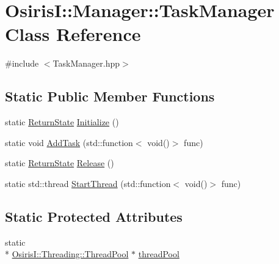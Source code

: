 \hypertarget{class_osiris_i_1_1_manager_1_1_task_manager}{\section{Osiris\-I\-:\-:Manager\-:\-:Task\-Manager Class Reference}
\label{class_osiris_i_1_1_manager_1_1_task_manager}
}


{\ttfamily \#include $<$Task\-Manager.\-hpp$>$}

\subsection*{Static Public Member Functions}
\begin{DoxyCompactItemize}
\item 
static \hyperlink{namespace_osiris_i_a8f53bf938dc75c65c6a529694514013e}{Return\-State} \hyperlink{class_osiris_i_1_1_manager_1_1_task_manager_a5c63688497335d230c16982063264760}{Initialize} ()
\item 
static void \hyperlink{class_osiris_i_1_1_manager_1_1_task_manager_ae21751b24ac0c69245a5f3a5583e3bf8}{Add\-Task} (std\-::function$<$ void()$>$ func)
\item 
static \hyperlink{namespace_osiris_i_a8f53bf938dc75c65c6a529694514013e}{Return\-State} \hyperlink{class_osiris_i_1_1_manager_1_1_task_manager_a0412532bf9b54b8df72de53f2b84e969}{Release} ()
\item 
static std\-::thread \hyperlink{class_osiris_i_1_1_manager_1_1_task_manager_a7442eb1b45c79c8c01910eb18ce39772}{Start\-Thread} (std\-::function$<$ void()$>$ func)
\end{DoxyCompactItemize}
\subsection*{Static Protected Attributes}
\begin{DoxyCompactItemize}
\item 
static \\*
\hyperlink{class_osiris_i_1_1_threading_1_1_thread_pool}{Osiris\-I\-::\-Threading\-::\-Thread\-Pool} $\ast$ \hyperlink{class_osiris_i_1_1_manager_1_1_task_manager_afeb4ecb2eb5eb28ef60ee2932e2641f9}{thread\-Pool}
\end{DoxyCompactItemize}


